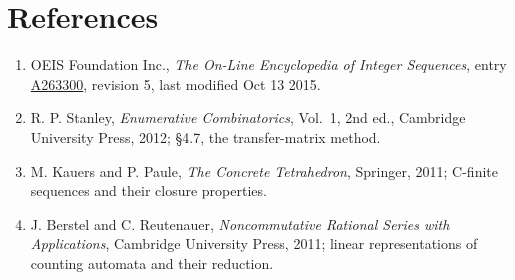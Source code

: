 \documentclass[11pt]{article}
\theoremstyle{definition}
\begin{document}
\section{References}

\begin{enumerate}

\item OEIS Foundation Inc., \emph{The On-Line Encyclopedia of Integer Sequences}, entry \href{https://oeis.org/A263300}{A263300}, revision 5, last modified Oct 13 2015.

\item R. P. Stanley, \emph{Enumerative Combinatorics}, Vol.~1, 2nd ed., Cambridge University Press, 2012; \S4.7, the transfer-matrix method.

\item M. Kauers and P. Paule, \emph{The Concrete Tetrahedron}, Springer, 2011; C-finite sequences and their closure properties.

\item J. Berstel and C. Reutenauer, \emph{Noncommutative Rational Series with Applications}, Cambridge University Press, 2011; linear representations of counting automata and their reduction.

\end{enumerate}
\end{document}

